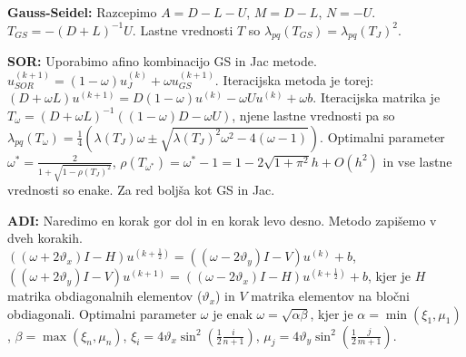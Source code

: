 \documentclass[a4paper,12pt]{article}
\theoremstyle{definition}
\renewcommand{\theta}{\vartheta}
\begin{document}
\textbf{Gauss-Seidel:}
Razcepimo $A = D - L - U$, $M = D - L$, $N = -U$. $T_{GS} = -(D+L)^{-1}U$. Lastne vrednosti $T$ so $\lambda_{pq}(T_{GS}) = \lambda_{pq}(T_J)^2$.

\textbf{SOR:}
Uporabimo afino kombinacijo GS in Jac metode.
$u^{(k+1)}_{SOR} = (1-\omega)u^{(k)}_{J} + \omega u^{(k+1)}_{GS}$.
Iteracijska metoda je torej:
$(D+\omega L)u^{(k+1)} = D(1-\omega) u^{(k)}- \omega Uu^{(k)} + \omega b$.
Iteracijska matrika je $T_{\omega} = (D+\omega L)^{-1}((1-\omega)D - \omega U)$,
njene lastne vrednosti pa so $\lambda_{pq}(T_\omega) = \frac{1}{4}
\left(\lambda(T_J) \omega \pm \sqrt{\lambda(T_J)^2 \omega^2 - 4(\omega-1)}
\right)$. Optimalni parameter $\omega^\ast = \frac{2}{1+\sqrt{1-\rho(T_J)^2}}$,
$\rho(T_{\omega^\ast}) = \omega^\ast - 1 = 1 - 2\sqrt{1+\pi^2}h + O(h^2)$ in vse
lastne vrednosti so enake. Za red boljša kot GS in Jac.

\textbf{ADI:}
Naredimo en korak gor dol in en korak levo desno. Metodo zapišemo v dveh korakih.\\
$((\omega + 2\theta_x)I - H)u^{(k+\frac12)} = ((\omega - 2\theta_y)I - V)u^{(k)} + b$,
$((\omega + 2\theta_y)I - V)u^{(k+1)} = ((\omega - 2\theta_x)I - H)u^{(k+\frac12)} + b$,
kjer je $H$ matrika obdiagonalnih elementov ($\theta_x$) in $V$ matrika elementov na bločni obdiagonali. Optimalni parameter $\omega$ je enak
$\omega = \sqrt{\alpha\beta}$, kjer je $\alpha=\min(\xi_1, \mu_1)$,
$\beta = \max(\xi_n, \mu_n)$,
$\xi_i = 4\theta_x\sin^2\left(\frac12 \frac{i}{n+1}\right)$,
$\mu_j = 4\theta_y\sin^2\left(\frac12 \frac{j}{m+1}\right)$.
\end{document}
